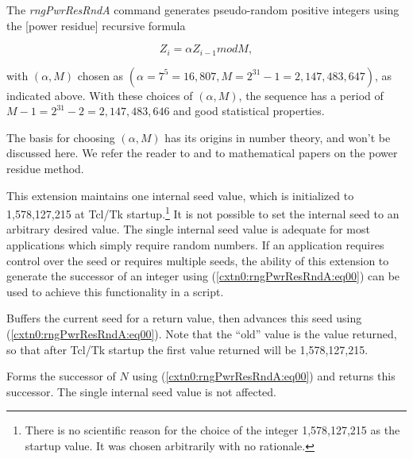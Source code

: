 \begin{tclcommanddescription}
The \emph{rngPwrResRndA} command generates pseudo-random positive integers
using the [power residue] recursive formula

\begin{equation}
\label{cxtn0:rngPwrResRndA:eq00}
Z_i = \alpha Z_{i-1} mod M,
\end{equation}

with $(\alpha, M)$ chosen as $(\alpha = 7^5=16,807, M = 2^{31}-1 = 2,147,483,647)$, as
indicated above.  With these choices of $(\alpha, M)$, the sequence has a period
of $M - 1 = 2^{31}-2 = 2,147,483,646$ and good statistical properties.

The basis for choosing $(\alpha, M)$ has its origins in number theory, and won't
be discussed here.  We refer the reader to \cite{bibref:b:LeonGarciaProb}
and to mathematical papers on the power residue method.

This extension maintains one internal seed value, which is initialized to
1,578,127,215 at Tcl/Tk startup.\footnote{There is no scientific
reason for the choice of the integer 1,578,127,215 as the
startup value.  It was chosen arbitrarily with no rationale.}  
It is not possible to set the internal
seed to an arbitrary desired value.  The single internal seed value is adequate
for most applications which simply require random numbers.  If an
application requires control over the seed or requires multiple seeds, the ability
of this extension to generate the successor of an integer using 
(\ref{cxtn0:rngPwrResRndA:eq00}) can be used to achieve this functionality in a
script.


\begin{tclcommandinternaldescription}
Buffers the current seed for a return value, then advances this seed using
(\ref{cxtn0:rngPwrResRndA:eq00}).  Note that the ``old'' value is the value
returned, so that after Tcl/Tk startup the first value 
returned will be 1,578,127,215.
\end{tclcommandinternaldescription}

\begin{tclcommandinternaldescription}
Forms the successor of $N$ using (\ref{cxtn0:rngPwrResRndA:eq00}) and
returns this successor.  The single internal seed value is not affected. 
\end{tclcommandinternaldescription}

\end{tclcommanddescription}


